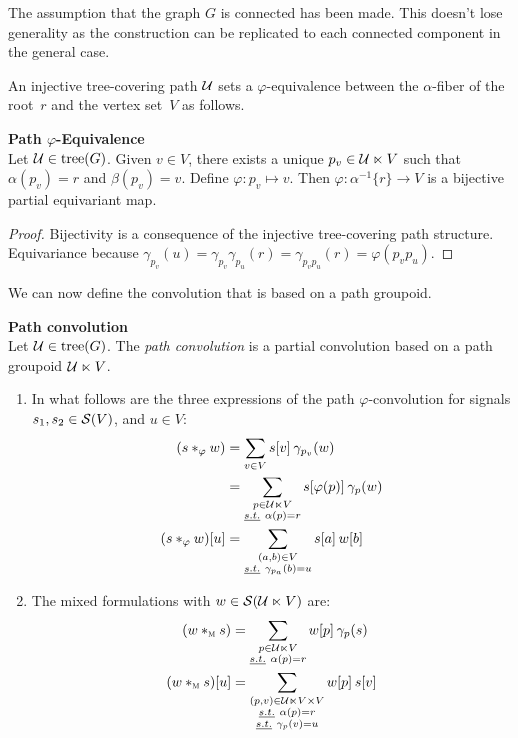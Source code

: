 \begin{remark}The assumption that the graph $G$ is connected has been made. This doesn't lose generality as the construction can be replicated to each connected component in the general case.
\end{remark}

An injective tree-covering path $\cu$ sets a $\varphi$-equivalence between the $\alpha$-fiber of the root~$r$ and the vertex set~$V$ as follows.

\begin{lemma}\textbf{Path $\varphi$-Equivalence}\\
Let $\cu \in \tree(G)$. Given $v \in V$, there exists a unique $p_v \in \cu \ltimes V$ such that $\alpha(p_v) = r$ and $\beta(p_v) = v$. Define $\varphi: p_v \mapsto v$. Then $\varphi: \alpha^{-1}\{r\} \rightarrow V$ is a bijective partial equivariant map.
\end{lemma}
\begin{proof}
Bijectivity is a consequence of the injective tree-covering path structure.
Equivariance because $\gamma_{p_v}(u) = \gamma_{p_v}\gamma_{p_u}(r) = \gamma_{p_vp_u}(r) = \varphi(p_vp_u)$.
\end{proof}

We can now define the convolution that is based on a path groupoid.

\begin{definition}\textbf{Path convolution}\\
Let $\cu \in \tree(G)$. The \emph{path convolution} is a partial convolution based on a path groupoid $\cu \ltimes V$.
\begin{enumerate}[label=(\roman*)]
  \item In what follows are the three expressions of the path $\varphi$-convolution for signals $s_1, s_2 \in \cs(V)$, and $u \in V$:
\begin{align*}
(s \ast_\varphi w) & = \displaystyle\sum_{v \in V} s[v] \h{2} \gamma_{p_v}(w)\\
                   & = \displaystyle\sum_{\substack{p \in \cu \ltimes V\\ \st \alpha(p) = r}} s[\varphi(p)] \h{2} \gamma_{p}(w)\\
(s \ast_\varphi w)[u] & = \displaystyle\sum_{\substack{(a,b) \in V\\ \st \gamma_{p_a}(b)=u}} s[a] \h{2} w[b]
\end{align*}
  \item The mixed formulations with $w \in \cs(\cu \ltimes V)$ are:
\begin{align*}
(w \ast_{\M} s) & = \displaystyle\sum_{\substack{p \in \cu \ltimes V\\ \st \alpha(p) = r}} w[p] \h{2} \gamma_{p}(s)\\
(w \ast_{\M} s)[u] & = \displaystyle\sum_{\substack{(p,v) \in \cu \ltimes V \times V\\ \st \alpha(p) = r\\ \st \gamma_{p}(v)=u}} w[p] \h{2} s[v]
\end{align*}
\end{enumerate}
\end{definition}

